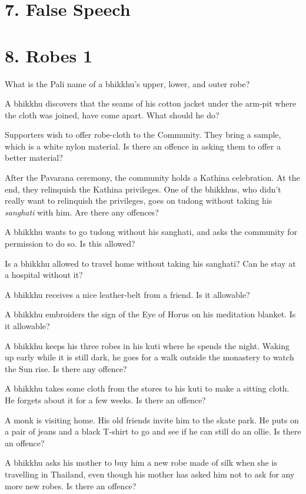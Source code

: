 \section{7. False Speech}

\section{8. Robes 1}

What is the Pali name of a bhikkhu's upper, lower, and outer robe?

A bhikkhu discovers that the seams of his cotton jacket under the
arm-pit where the cloth was joined, have come apart. What should he do?

Supporters wish to offer robe-cloth to the Community. They bring a
sample, which is a white nylon material. Is there an offence in asking
them to offer a better material?

After the Pavarana ceremony, the community holds a Kathina celebration.
At the end, they relinquish the Kathina privileges. One of the bhikkhus,
who didn't really want to relinquish the privileges, goes on tudong
without taking his \emph{sanghati} with him. Are there any offences?

A bhikkhu wants to go tudong without his sanghati, and asks the
community for permission to do so. Is this allowed?

Is a bhikkhu allowed to travel home without taking his sanghati? Can he
stay at a hospital without it?

A bhikkhu receives a nice leather-belt from a friend. Is it allowable?

A bhikkhu embroiders the sign of the Eye of Horus on his meditation
blanket. Is it allowable?

A bhikkhu keeps his three robes in his kuti where he spends the night.
Waking up early while it is still dark, he goes for a walk outside the
monastery to watch the Sun rise. Is there any offence?

A bhikkhu takes some cloth from the stores to his kuti to make a sitting
cloth. He forgets about it for a few weeks. Is there an offence?

A monk is visiting home. His old friends invite him to the skate park.
He puts on a pair of jeans and a black T-shirt to go and see if he can
still do an ollie. Is there an offence?

A bhikkhu asks his mother to buy him a new robe made of silk when she is
travelling in Thailand, even though his mother has asked him not to ask
for any more new robes. Is there an offence?

